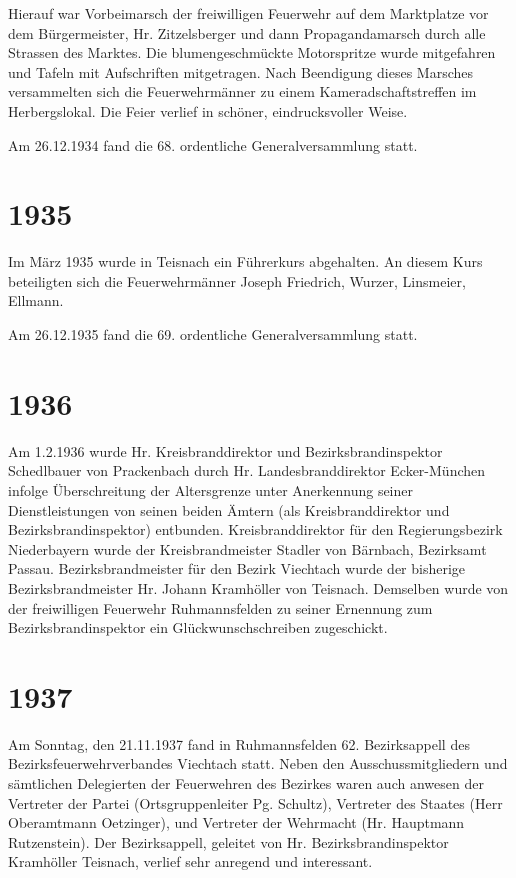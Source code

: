 \documentclass[12pt,a4paper]{book}
\begin{document}
Hierauf war Vorbeimarsch der freiwilligen Feuerwehr auf dem     Marktplatze vor
dem Bürgermeister, Hr. Zitzelsberger und dann Propagandamarsch durch alle
Strassen des Marktes. Die blumengeschmückte Motorspritze wurde mitgefahren und
Tafeln mit Aufschriften mitgetragen. Nach Beendigung dieses Marsches
versammelten sich die Feuerwehrmänner zu einem Kameradschaftstreffen im
Herbergslokal. Die Feier verlief in schöner, eindrucksvoller Weise.

Am 26.12.1934 fand die 68. ordentliche Generalversammlung statt.

\section*{1935}

Im März 1935 wurde in Teisnach ein Führerkurs abgehalten. An diesem Kurs
beteiligten sich die Feuerwehrmänner Joseph Friedrich, Wurzer, Linsmeier,
Ellmann.

Am 26.12.1935 fand die 69. ordentliche Generalversammlung statt.

\section*{1936}

Am 1.2.1936 wurde Hr. Kreisbranddirektor und Bezirksbrandinspektor Schedlbauer
von Prackenbach durch Hr. Landesbranddirektor Ecker-München infolge
Überschreitung der Altersgrenze unter Anerkennung seiner Dienstleistungen von
seinen beiden Ämtern (als Kreisbranddirektor und Bezirksbrandinspektor)
entbunden. Kreisbranddirektor für den Regierungsbezirk Niederbayern wurde der
Kreisbrandmeister Stadler von Bärnbach, Bezirksamt Passau. Bezirksbrandmeister
für den Bezirk Viechtach wurde der bisherige Bezirksbrandmeister Hr. Johann
Kramhöller von Teisnach. Demselben wurde von der freiwilligen Feuerwehr
Ruhmannsfelden zu seiner Ernennung zum Bezirksbrandinspektor ein
Glückwunschschreiben zugeschickt.

\section*{1937}

Am Sonntag, den 21.11.1937 fand in Ruhmannsfelden 62. Bezirksappell des
Bezirksfeuerwehrverbandes Viechtach statt. Neben den Ausschussmitgliedern und
sämtlichen Delegierten der Feuerwehren des Bezirkes waren auch anwesen der
Vertreter der Partei (Ortsgruppenleiter Pg. Schultz), Vertreter des Staates
(Herr Oberamtmann Oetzinger), und Vertreter der Wehrmacht (Hr. Hauptmann
Rutzenstein). Der Bezirksappell, geleitet von Hr. Bezirksbrandinspektor
Kramhöller Teisnach, verlief sehr anregend und interessant.
\end{document}
